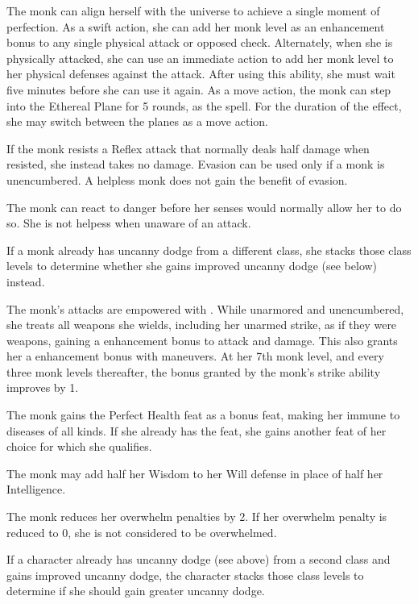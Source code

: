  The monk can align herself with the universe to achieve a single moment of perfection. As a swift action, she can add her monk level as an enhancement bonus to any single physical attack or opposed check. Alternately, when she is physically attacked, she can use an immediate action to add her monk level to her physical defenses against the attack. After using this ability, she must wait five minutes before she can use it again.
 As a move action, the monk can step into the Ethereal Plane for 5 rounds, as the  spell. For the duration of the effect, she may switch between the planes as a move action.

 If the monk resists a Reflex attack that normally deals half damage when resisted, she instead takes no damage. Evasion can be used only if a monk is unencumbered. A helpless monk does not gain the benefit of evasion.

 The monk can react to danger before her senses would normally allow her to do so. She is not helpess when unaware of an attack.

If a monk already has uncanny dodge from a different class, she stacks those class levels to determine whether she gains improved uncanny dodge (see below) instead.

 The monk's attacks are empowered with \ki. While unarmored and unencumbered, she treats all weapons she wields, including her unarmed strike, as if they were  weapons, gaining a  enhancement bonus to attack and damage. This also grants her a  enhancement bonus with maneuvers. At her 7th monk level, and every three monk levels thereafter, the bonus granted by the monk's \ki strike ability improves by 1. 

 The monk gains the Perfect Health feat as a bonus feat, making her immune to diseases of all kinds. If she already has the feat, she gains another feat of her choice for which she qualifies.

 The monk may add half her Wisdom to her Will defense in place of half her Intelligence.

  The monk reduces her overwhelm penalties by 2. If her overwhelm penalty is reduced to 0, she is not considered to be overwhelmed.
\par If a character already has uncanny dodge (see above) from a second class and gains improved uncanny dodge, the character stacks those class levels to determine if she should gain greater uncanny dodge.

